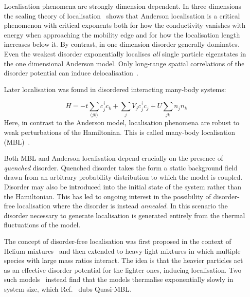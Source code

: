 Localisation phenomena are strongly dimension dependent. In three dimensions the scaling theory of localisation~\autocite{edwardsNumericalStudiesLocalization1972,kramerLocalizationTheoryExperiment1993} shows that Anderson localisation is a critical phenomenon with critical exponents both for how the conductivity vanishes with energy when approaching the mobility edge and for how the localisation length increases below it. By contrast, in one dimension disorder generally dominates. Even the weakest disorder exponentially localises \emph{all} single particle eigenstates in the one dimensional Anderson model. Only long-range spatial correlations of the disorder potential can induce delocalisation~\autocite{aubryAnalyticityBreakingAnderson1980,dassarmaLocalizationMobilityEdges1990,dunlapAbsenceLocalizationRandomdimer1990,izrailevLocalizationMobilityEdge1999,croyAndersonLocalization1D2011,izrailevAnomalousLocalizationLowDimensional2012}.

Later localisation was found in disordered interacting many-body systems:

\[
H = -t\sum_{\langle jk \rangle} c^\dagger_j c_k + \sum_j V_j c_j^\dagger c_j + U\sum_{jk} n_j n_k
\] Here, in contrast to the Anderson model, localisation phenomena are robust to weak perturbations of the Hamiltonian. This is called many-body localisation (MBL)~\autocite{imbrieManyBodyLocalizationQuantum2016}.

Both MBL and Anderson localisation depend crucially on the presence of \emph{quenched} disorder. Quenched disorder takes the form a static background field drawn from an arbitrary probability distribution to which the model is coupled. Disorder may also be introduced into the initial state of the system rather than the Hamiltonian. This has led to ongoing interest in the possibility of disorder-free localisation where the disorder is instead \emph{annealed}. In this scenario the disorder necessary to generate localisation is generated entirely from the thermal fluctuations of the model.

The concept of disorder-free localisation was first proposed in the context of Helium mixtures~\autocite{kagan1984localization} and then extended to heavy-light mixtures in which multiple species with large mass ratios interact. The idea is that the heavier particles act as an effective disorder potential for the lighter ones, inducing localisation. Two such models~\autocite{yaoQuasiManyBodyLocalizationTranslationInvariant2016,schiulazDynamicsManybodyLocalized2015} instead find that the models thermalise exponentially slowly in system size, which Ref.~\autocite{yaoQuasiManyBodyLocalizationTranslationInvariant2016} dubs Quasi-MBL.

